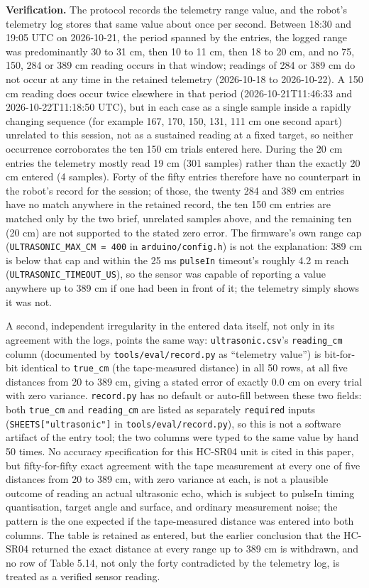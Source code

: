 \textbf{Verification.} The protocol records the telemetry range value, and the robot's telemetry log stores that same value about once per second. Between 18:30 and 19:05 UTC on 2026-10-21, the period spanned by the entries, the logged range was predominantly 30 to 31 cm, then 10 to 11 cm, then 18 to 20 cm, and no 75, 150, 284 or 389 cm reading occurs in that window; readings of 284 or 389 cm do not occur at any time in the retained telemetry (2026-10-18 to 2026-10-22). A 150 cm reading does occur twice elsewhere in that period (2026-10-21T11:46:33 and 2026-10-22T11:18:50 UTC), but in each case as a single sample inside a rapidly changing sequence (for example 167, 170, 150, 131, 111 cm one second apart) unrelated to this session, not as a sustained reading at a fixed target, so neither occurrence corroborates the ten 150 cm trials entered here. During the 20 cm entries the telemetry mostly read 19 cm (301 samples) rather than the exactly 20 cm entered (4 samples). Forty of the fifty entries therefore have no counterpart in the robot's record for the session; of those, the twenty 284 and 389 cm entries have no match anywhere in the retained record, the ten 150 cm entries are matched only by the two brief, unrelated samples above, and the remaining ten (20 cm) are not supported to the stated zero error. The firmware's own range cap (\texttt{ULTRASONIC\_MAX\_CM = 400} in \texttt{arduino/config.h}) is not the explanation: 389 cm is below that cap and within the 25 ms \texttt{pulseIn} timeout's roughly 4.2 m reach (\texttt{ULTRASONIC\_TIMEOUT\_US}), so the sensor was capable of reporting a value anywhere up to 389 cm if one had been in front of it; the telemetry simply shows it was not.

A second, independent irregularity in the entered data itself, not only in its agreement with the logs, points the same way: \texttt{ultrasonic.csv}'s \texttt{reading\_cm} column (documented by \texttt{tools/eval/record.py} as ``telemetry value'') is bit-for-bit identical to \texttt{true\_cm} (the tape-measured distance) in all 50 rows, at all five distances from 20 to 389 cm, giving a stated error of exactly 0.0 cm on every trial with zero variance. \texttt{record.py} has no default or auto-fill between these two fields: both \texttt{true\_cm} and \texttt{reading\_cm} are listed as separately \texttt{required} inputs (\texttt{SHEETS["ultrasonic"]} in \texttt{tools/eval/record.py}), so this is not a software artifact of the entry tool; the two columns were typed to the same value by hand 50 times. No accuracy specification for this HC-SR04 unit is cited in this paper, but fifty-for-fifty exact agreement with the tape measurement at every one of five distances from 20 to 389 cm, with zero variance at each, is not a plausible outcome of reading an actual ultrasonic echo, which is subject to pulseIn timing quantisation, target angle and surface, and ordinary measurement noise; the pattern is the one expected if the tape-measured distance was entered into both columns. The table is retained as entered, but the earlier conclusion that the HC-SR04 returned the exact distance at every range up to 389 cm is withdrawn, and no row of Table 5.14, not only the forty contradicted by the telemetry log, is treated as a verified sensor reading.

